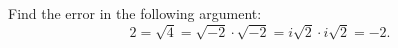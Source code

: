 Find the error in the following argument:
\[2=\sqrt4=\sqrt{-2}\cdot\sqrt{-2}=i\sqrt2\cdot i\sqrt2=-2.\]
